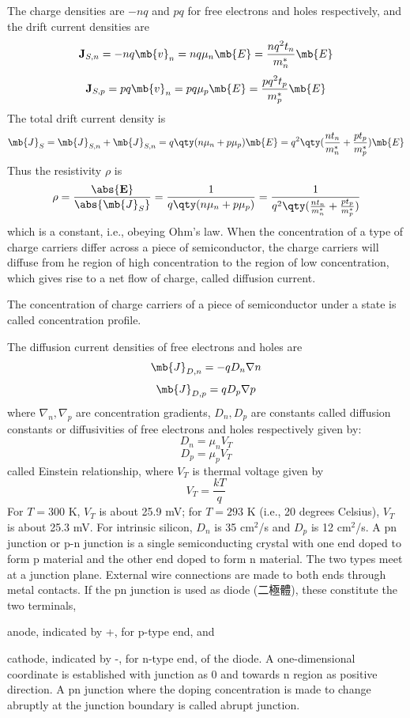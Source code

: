 \documentclass[a4paper,12pt]{report}
\begin{document}
The charge densities are $-nq$ and $pq$ for free electrons and holes respectively, and the drift current densities are
\[\mathbf{J}_{S,n}=-nq\mb{v}_n=nq\mu_n\mb{E}=\frac{nq^2t_n}{m_n^*}\mb{E}\]
\[\mathbf{J}_{S,p}=pq\mb{v}_n=pq\mu_p\mb{E}=\frac{pq^2t_p}{m_p^*}\mb{E}\]
The total drift current density is
\[\mb{J}_S=\mb{J}_{S,n}+\mb{J}_{S,n}=q\qty(n\mu_n+p\mu_p)\mb{E}=q^2\qty(\frac{nt_n}{m_n^*}+\frac{pt_p}{m_p^*})\mb{E}\]
Thus the resistivity $\rho$ is
\[\rho=\frac{\abs{\mathbf{E}}}{\abs{\mb{J}_S}}=\frac{1}{q\qty(n\mu_n+p\mu_p)}=\frac{1}{q^2\qty(\frac{nt_n}{m_n^*}+\frac{pt_p}{m_p^*})}\]
which is a constant, i.e., obeying Ohm's law.
When the concentration of a type of charge carriers differ across a piece of semiconductor, the charge carriers will diffuse from he region of high concentration to the region of low concentration, which gives rise to a net flow of charge, called diffusion current.

The concentration of charge carriers of a piece of semiconductor under a state is called concentration profile.

The diffusion current densities of free electrons and holes are
\[\mb{J}_{D,n}=-qD_n\nabla n\]
\[\mb{J}_{D,p}=qD_p\nabla p\]
where $\nabla_n,\nabla_p$ are concentration gradients, $D_n,D_p$ are constants called diffusion constants or diffusivities of free electrons and holes respectively given by:
\[D_n=\mu_nV_T\]
\[D_p=\mu_pV_T\]
called Einstein relationship, where $V_T$ is thermal voltage given by
\[V_T=\frac{kT}{q}\]
For $T=300$ K, $V_T$ is about 25.9 mV; for $T=293$ K (i.e., 20 degrees Celsius), $V_T$ is about 25.3 mV. For intrinsic silicon, $D_n$ is 35 cm$^2$/s and $D_p$ is 12 cm$^2$/s.
A pn junction or p-n junction is a single semiconducting crystal with one end doped to form p material and the other end doped to form n material. The two types meet at a junction plane. External wire connections are made to both ends through metal contacts. If the pn junction is used as diode (二極體), these constitute the two terminals,
\bit
\item anode, indicated by +, for p-type end, and
\item cathode, indicated by -, for n-type end, of the diode.
\eit
A one-dimensional coordinate is established with junction as 0 and towards n region as positive direction.
A pn junction where the doping concentration is made to change abruptly at the junction boundary is called abrupt junction.
\end{document}
